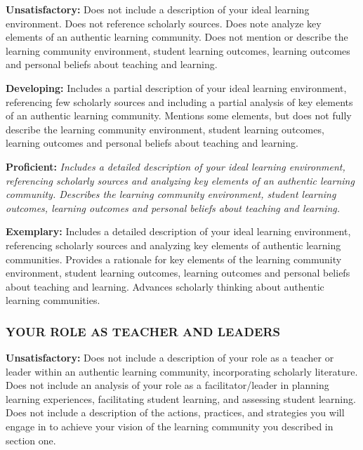 \documentclass[
]{book}
\begin{document}
\textbf{Unsatisfactory:} Does not include a description of your ideal learning environment. Does not reference scholarly sources. Does note analyze key elements of an authentic learning community. Does not mention or describe the learning community environment, student learning outcomes, learning outcomes and personal beliefs about teaching and learning.

\textbf{Developing:} Includes a partial description of your ideal learning environment, referencing few scholarly sources and including a partial analysis of key elements of an authentic learning community. Mentions some elements, but does not fully describe the learning community environment, student learning outcomes, learning outcomes and personal beliefs about teaching and learning.

\textbf{Proficient:} \emph{Includes a detailed description of your ideal learning environment, referencing scholarly sources and analyzing key elements of an authentic learning community. Describes the learning community environment, student learning outcomes, learning outcomes and personal beliefs about teaching and learning.}

\textbf{Exemplary:} Includes a detailed description of your ideal learning environment, referencing scholarly sources and analyzing key elements of authentic learning communities. Provides a rationale for key elements of the learning community environment, student learning outcomes, learning outcomes and personal beliefs about teaching and learning. Advances scholarly thinking about authentic learning communities.

\hypertarget{your-role-as-teacher-and-leaders}{%
\subsubsection*{YOUR ROLE AS TEACHER AND LEADERS}\label{your-role-as-teacher-and-leaders}}

\textbf{Unsatisfactory:} Does not include a description of your role as a teacher or leader within an authentic learning community, incorporating scholarly literature. Does not include an analysis of your role as a facilitator/leader in planning learning experiences, facilitating student learning, and assessing student learning. Does not include a description of the actions, practices, and strategies you will engage in to achieve your vision of the learning community you described in section one.
\end{document}
